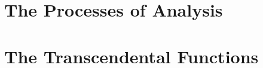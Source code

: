 \documentclass{book}
\numberwithin{equation}{subsection}
\theoremstyle{remark}
\begin{document}

\tableofcontents
\part{The Processes of Analysis}











\part{The Transcendental Functions}












\appendix



\printindex
\end{document}
